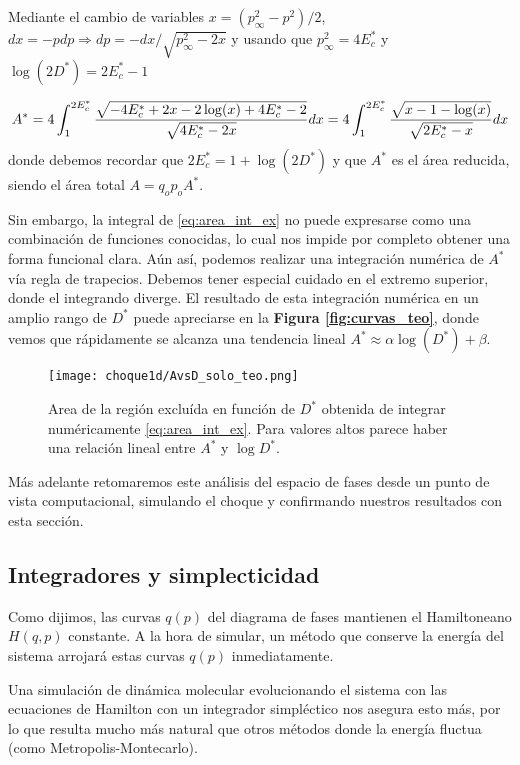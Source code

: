 Mediante el cambio de variables $x = (p_\infty^2-p^2)/2$, $dx = -p dp \Rightarrow dp = -dx/\sqrt{p_\infty^2-2x}$ y usando que $p_\infty^2 = 4E^*_c$ y $\log(2D^*) = 2E_c^* - 1$

\begin{equation}{\label{eq:area_int_ex}}
A^* = 4\int_{1}^{2E_c^*} \frac{\sqrt{-4E_c^* + 2x - 2\log(x) + 4E_c^* - 2}}{\sqrt{4E_c^* - 2x}} dx
= 4\int_{1}^{2E_c^*} \frac{\sqrt{x -1 - \log(x)}}{\sqrt{2E_c^* - x}} dx
\end{equation}
donde debemos recordar que $2E_c^* = 1 + \log(2D^*) $ y que $A^*$ es el área reducida, siendo el área total $A = q_op_oA^*$.

Sin embargo, la integral de \eqref{eq:area_int_ex} no puede expresarse como una combinación de funciones conocidas, lo cual nos impide por completo obtener una forma funcional clara.
Aún así, podemos realizar una integración numérica de $A^*$ vía regla de trapecios.
Debemos tener especial cuidado en el extremo superior, donde el integrando diverge.
El resultado de esta integración numérica en un amplio rango de $D^*$ puede apreciarse en la \textbf{Figura \ref{fig:curvas_teo}}, donde vemos que rápidamente se alcanza una tendencia lineal $A^* \approx \alpha \log(D^*) + \beta$.

\begin{figure}
	\centering
	\texttt{[image: choque1d/AvsD\_solo\_teo.png]}
	\caption{Area de la región excluída en función de $D^*$ obtenida de integrar numéricamente \eqref{eq:area_int_ex}. Para valores altos parece haber una relación lineal entre $A^*$ y $\log D^*$.}
\end{figure}

Más adelante retomaremos este análisis del espacio de fases desde un punto de vista computacional, simulando el choque y confirmando nuestros resultados con esta sección.




\subsection{Integradores y simplecticidad}

Como dijimos, las curvas $q(p)$ del diagrama de fases mantienen el Hamiltoneano $H(q,p)$ constante.
A la hora de simular, un método que conserve la energía del sistema arrojará estas curvas $q(p)$ inmediatamente.

Una simulación de dinámica molecular evolucionando el sistema con las ecuaciones de Hamilton con un integrador simpléctico nos asegura esto más, por lo que resulta mucho más natural que otros métodos donde la energía fluctua (como Metropolis-Montecarlo).



